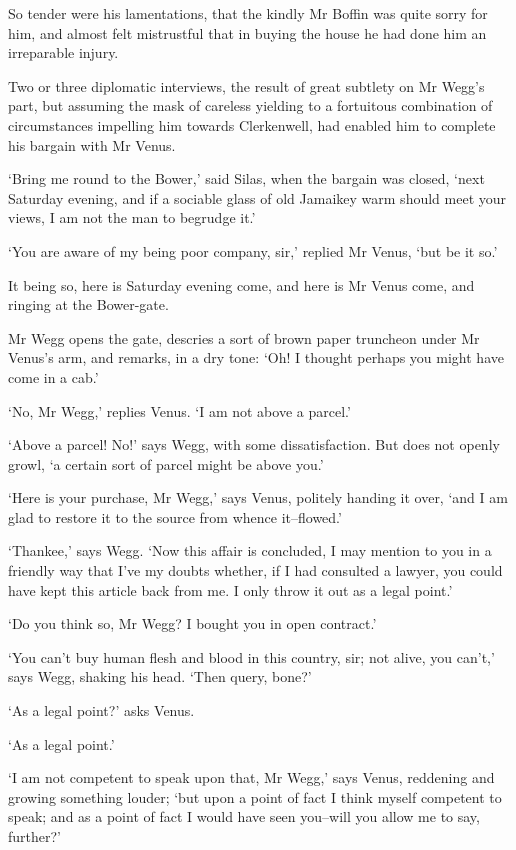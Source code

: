 So tender were his lamentations, that the kindly Mr Boffin was quite
sorry for him, and almost felt mistrustful that in buying the house he
had done him an irreparable injury.

Two or three diplomatic interviews, the result of great subtlety on Mr
Wegg’s part, but assuming the mask of careless yielding to a fortuitous
combination of circumstances impelling him towards Clerkenwell, had
enabled him to complete his bargain with Mr Venus.

‘Bring me round to the Bower,’ said Silas, when the bargain was closed,
‘next Saturday evening, and if a sociable glass of old Jamaikey warm
should meet your views, I am not the man to begrudge it.’

‘You are aware of my being poor company, sir,’ replied Mr Venus, ‘but be
it so.’

It being so, here is Saturday evening come, and here is Mr Venus come,
and ringing at the Bower-gate.

Mr Wegg opens the gate, descries a sort of brown paper truncheon under
Mr Venus’s arm, and remarks, in a dry tone: ‘Oh! I thought perhaps you
might have come in a cab.’

‘No, Mr Wegg,’ replies Venus. ‘I am not above a parcel.’

‘Above a parcel! No!’ says Wegg, with some dissatisfaction. But does not
openly growl, ‘a certain sort of parcel might be above you.’

‘Here is your purchase, Mr Wegg,’ says Venus, politely handing it over,
‘and I am glad to restore it to the source from whence it--flowed.’

‘Thankee,’ says Wegg. ‘Now this affair is concluded, I may mention to
you in a friendly way that I’ve my doubts whether, if I had consulted a
lawyer, you could have kept this article back from me. I only throw it
out as a legal point.’

‘Do you think so, Mr Wegg? I bought you in open contract.’

‘You can’t buy human flesh and blood in this country, sir; not alive,
you can’t,’ says Wegg, shaking his head. ‘Then query, bone?’

‘As a legal point?’ asks Venus.

‘As a legal point.’

‘I am not competent to speak upon that, Mr Wegg,’ says Venus, reddening
and growing something louder; ‘but upon a point of fact I think myself
competent to speak; and as a point of fact I would have seen you--will
you allow me to say, further?’

